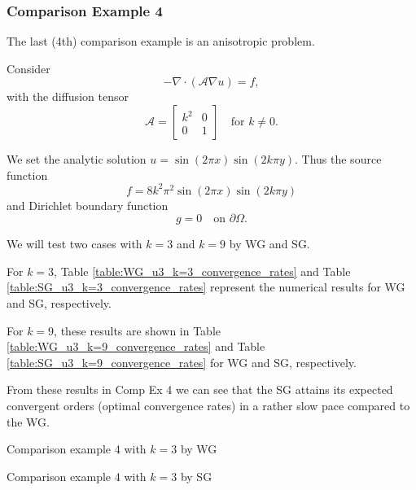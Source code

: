 	
	\subsubsection*{Comparison Example 4}
	The last (4th) comparison example is an anisotropic problem.
	
	Consider 
	\[-\nabla\cdot(\mathcal{A}\nabla u)=f,\]
	with the diffusion tensor 
	\[\mathcal{A}=\begin{bmatrix}
		k^2 & 0\\
		0 & 1
	\end{bmatrix}\quad \textrm{for } k\neq0.\]
	
	We set the analytic solution $u=\sin(2\pi x)\sin(2k\pi y)$. Thus the
	source function  
	\[ f= 8k^2\pi^2\sin(2\pi x)\sin(2k\pi y)\]
	and Dirichlet boundary function
	\[ g=0\quad \text{on }\partial\Omega.\]
	
	We will test two cases with $k=3$ and $k=9$ by WG and SG.
	
	For $k=3$, Table \ref{table:WG_u3_k=3_convergence_rates}
	and Table \ref{table:SG_u3_k=3_convergence_rates} represent the numerical
	results for WG and SG, respectively.
	
	For $k=9$, these results are shown in Table 
	\ref{table:WG_u3_k=9_convergence_rates} and Table
	\ref{table:SG_u3_k=9_convergence_rates} for WG and SG, respectively.
	
	From these results in Comp Ex 4 we can see that the SG attains its 
	expected convergent	orders (optimal convergence rates) in a rather slow 
	pace compared to the WG.
	
	
	\begin{table}[!htbp]
	\begin{mdframed}[linecolor=red,linewidth=.5pt,roundcorner=10pt]
		\centering		
		\caption{Comparison example 4 with $k=3$ by WG}\vspace{-5pt}
		
		\label{table:WG_u3_k=3_convergence_rates}
		\vspace{10pt}
		\caption{Comparison example 4 with $k=3$ by SG}\vspace{-5pt}
		
		\label{table:SG_u3_k=3_convergence_rates}
	\end{mdframed}
	\end{table}\vspace{-5pt}


